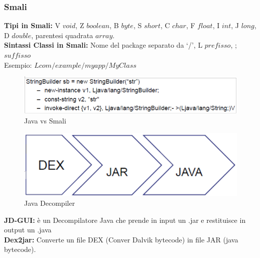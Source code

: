 \documentclass{article}
\begin{document}
\subsubsection{Smali}
\noindent
\textbf{Tipi in Smali:} V \(void\), Z \(boolean\), B \(byte\), S \(short\), C \(char\), F \(float\), I \(int\), J \(long\), D \(double\), parentesi quadrata \(array\).\\
\textbf{Sintassi Classi in Smali:} Nome del package separato da ‘/’, L \(prefisso\), ; \(suffisso\)\\
Esempio: \(Lcom/example/myapp/MyClass\)
\begin{figure}[H]
    \center
    \includegraphics[scale=0.4]{images/RCE5.png}
    \caption{Java vs Smali}\label{fig:1}
\end{figure}
\begin{figure}[H]
    \center
    \includegraphics[scale=0.3]{images/RCE6.png}
    \caption{Java Decompiler}\label{fig:1}
\end{figure}
\noindent
\textbf{JD-GUI:} è un Decompilatore Java che prende in input un .jar e restituisce in output un .java\\
\textbf{Dex2jar:} Converte un file DEX (Conver Dalvik bytecode) in file JAR (java bytecode).
\end{document}
